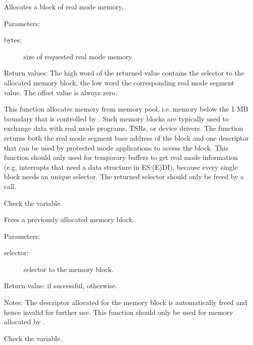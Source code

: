 
{Allocates a block of \dos real mode memory.

Parameters: 
\begin{description}
\item [bytes:\ ] size of requested real mode memory.
\end{description}

Return values: The high word of the returned value contains the selector to
the allocated \dos memory block, the low word the corresponding real mode
segment value. The offset value is always zero.

This function allocates memory from \dos memory pool, i.e. memory below the 1
MB boundary that is controlled by \dos. Such memory blocks are typically used
to exchange data with real mode programs, TSRs, or device drivers. The
function returns both the real mode segment base address of the block and
one descriptor that can be used by protected mode applications to access the
block. This function should only used for temporary buffers to get real mode
information (e.g. interrupts that need a data structure in ES:(E)DI),
because every single block needs an unique selector. The returned selector
should only be freed by a   call.
}{ Check the  variable.}
{  }

\html{}

{Frees a previously allocated \dos memory block.

Parameters:
\begin{description}
\item[selector:\ ] selector to the \dos memory block.
\end{description}

Return value:  if successful,  otherwise.

Notes: The descriptor allocated for the memory block is automatically freed
and hence invalid for further use. This function should only be used for
memory allocated by .
}
{ Check the  variable.}
{ }

